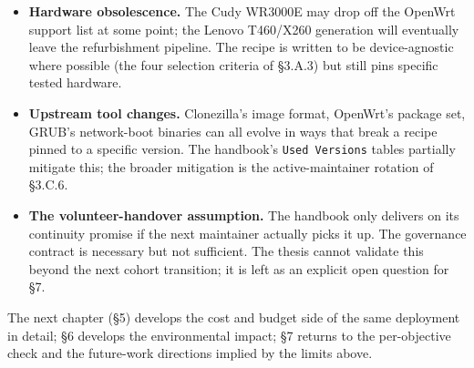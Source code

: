 \begin{itemize}
\tightlist
\item
  \textbf{Hardware obsolescence.} The Cudy WR3000E may drop off the
  OpenWrt support list at some point; the Lenovo T460/X260 generation
  will eventually leave the refurbishment pipeline. The recipe is
  written to be device-agnostic where possible (the four selection
  criteria of §3.A.3) but still pins specific tested hardware.
\item
  \textbf{Upstream tool changes.} Clonezilla's image format, OpenWrt's
  package set, GRUB's network-boot binaries can all evolve in ways that
  break a recipe pinned to a specific version. The handbook's
  \texttt{Used\ Versions} tables partially mitigate this; the broader
  mitigation is the active-maintainer rotation of §3.C.6.
\item
  \textbf{The volunteer-handover assumption.} The handbook only delivers
  on its continuity promise if the next maintainer actually picks it up.
  The governance contract is necessary but not sufficient. The thesis
  cannot validate this beyond the next cohort transition; it is left as
  an explicit open question for §7.
\end{itemize}

The next chapter (§5) develops the cost and budget side of the same
deployment in detail; §6 develops the environmental impact; §7 returns
to the per-objective check and the future-work directions implied by the
limits above.
